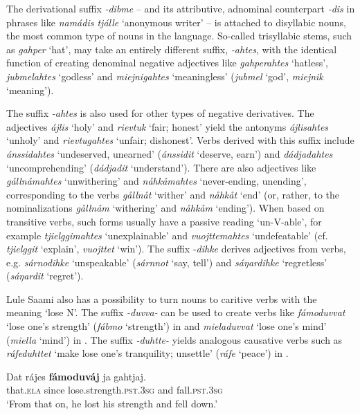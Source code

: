 \documentclass[output=paper,colorlinks,citecolor=brown]{langscibook}
\begin{document}
The derivational suffix \textit{{}-dibme} – and its attributive, adnominal counterpart \textit{\nobreakdash-dis} in phrases like \textit{namádis tjálle} ‘anonymous writer’ – is attached to disyllabic nouns, the most common type of nouns in the language. So-called trisyllabic stems, such as \textit{gahper} ‘hat’, may take an entirely different suffix, \textit{{}-ahtes}, with the identical function of creating denominal negative adjectives like \textit{gahperahtes} ‘hatless’, \textit{jubmelahtes} ‘godless’ and \textit{miejnigahtes} ‘meaningless’ (\leftarrow\space \textit{jubmel} ‘god’, \textit{miejnik} ‘meaning’).

The suffix \textit{{}-ahtes} is also used for other types of negative derivatives. The adjectives \textit{ájlis} ‘holy’ and \textit{rievtuk} ‘fair; honest’ yield the antonyms \textit{ájlisahtes} ‘unholy’ and \textit{rievtugahtes} ‘unfair; dishonest’.
Verbs derived with this suffix include \textit{ánssidahtes} ‘undeserved, unearned’ (\leftarrow\space \textit{ánssidit} ‘deserve, earn’) and \textit{dádjadahtes} ‘uncomprehending’ (\leftarrow\space \textit{dádjadit} ‘understand’).
There are also adjectives like \textit{gållnåmahtes} ‘unwithering’ and \textit{nåhkåmahtes} ‘never-ending, unending’, corresponding to the verbs \textit{gållnåt} ‘wither’ and \textit{nåhkåt} ‘end’ (or, rather, to the nominalizations \textit{gållnåm} ‘withering’ and \textit{nåhkåm} ‘ending’). When based on transitive verbs, such forms usually have a passive reading ‘un-V-able’, for example \textit{tjielggimahtes} ‘unexplainable’ and \textit{vuojttemahtes} ‘undefeatable’ (cf. \textit{tjielggit} ‘explain’, \textit{vuojttet} ‘win’).
The suffix -\textit{dihke} derives adjectives from verbs, e.g. \textit{sárnodihke} ‘unspeakable’ (\leftarrow\space  \textit{sárnnot} ‘say, tell’) and \textit{sáŋardihke} ‘regretless’ (\leftarrow\space  \textit{sáŋardit} ‘regret’).

Lule Saami also has a possibility to turn nouns to caritive verbs with the meaning ‘lose N’. The suffix \textit{{}-duvva{}-} can be used to create verbs like \textit{fámoduvvat} ‘lose one’s strength’ (\leftarrow\space \textit{fábmo} ‘strength’) in  and \textit{mieladuvvat} ‘lose one’s mind’ (\leftarrow\space \textit{miella} ‘mind’) in . The suffix \textit{{}-duhtte{}-} yields analogous causative verbs such as \textit{ráfeduhttet} ‘make lose one’s tranquility; unsettle’ (\leftarrow\space  \textit{ráfe} ‘peace’) in .

\ea\label{ex:lul:36} 
    \gll Dat rájes \textbf{fámoduváj} ja gahtjaj. \\ 
         that\textsc{.ela} since lose.strength.\textsc{pst.3sg} and fall.\textsc{pst.3sg} \\
    \glt ‘From that on, he lost his strength and fell down.’  \citep{SIKOR2021}
\z 
\end{document}
